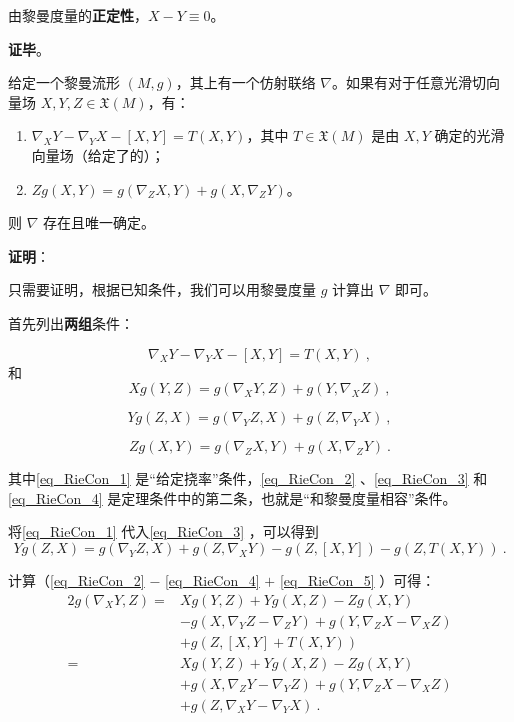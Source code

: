 由黎曼度量的\textbf{正定性}，$X-Y\equiv 0$。

\textbf{证毕}。






\begin{theorem}{}\label{the_RieCon_1}
给定一个黎曼流形 $(M, g)$，其上有一个仿射联络 $\nabla$。如果有对于任意光滑切向量场 $X, Y, Z\in\mathfrak{X}(M)$，有：
\begin{enumerate}
\item $\nabla_XY-\nabla_YX-[X, Y]=T(X, Y)$，其中 $T\in \mathfrak{X}(M)$ 是由 $X, Y$ 确定的光滑向量场（给定了的）；
\item $Zg(X, Y)=g(\nabla_ZX, Y)+g(X, \nabla_ZY)$。
\end{enumerate}
则 $\nabla$ 存在且唯一确定。
\end{theorem}

\textbf{证明}：

只需要证明，根据已知条件，我们可以用黎曼度量 $g$ 计算出 $\nabla$ 即可。

首先列出\textbf{两组}条件：

\begin{equation}\label{eq_RieCon_1}
\nabla_XY-\nabla_YX-[X, Y]=T(X, Y)~,
\end{equation}
和
\begin{equation}\label{eq_RieCon_2}
Xg(Y, Z)=g(\nabla_XY, Z)+g(Y, \nabla_XZ)~,
\end{equation}

\begin{equation}\label{eq_RieCon_3}
Yg(Z, X)=g(\nabla_YZ, X)+g(Z, \nabla_YX)~,
\end{equation}

\begin{equation}\label{eq_RieCon_4}
Zg(X, Y)=g(\nabla_ZX, Y)+g(X, \nabla_ZY)~.
\end{equation}


其中\autoref{eq_RieCon_1} 是“给定挠率”条件，\autoref{eq_RieCon_2} 、\autoref{eq_RieCon_3} 和\autoref{eq_RieCon_4} 是定理条件中的第二条，也就是“和黎曼度量相容”条件。

将\autoref{eq_RieCon_1} 代入\autoref{eq_RieCon_3} ，可以得到
\begin{equation}\label{eq_RieCon_5}
Yg(Z, X)=g(\nabla_YZ, X)+g(Z, \nabla_XY)-g(Z, [X, Y])-g(Z, T(X, Y))~.
\end{equation}

计算（\autoref{eq_RieCon_2} $-$ \autoref{eq_RieCon_4} $+$ \autoref{eq_RieCon_5} ）可得：
\begin{equation}\label{eq_RieCon_6}
\begin{aligned}
2g(\nabla_XY, Z)=&Xg(Y, Z)+Yg(X, Z)-Zg(X, Y)\\&-g(X, \nabla_YZ-\nabla_ZY)+g(Y, \nabla_ZX-\nabla_XZ)\\&+g(Z, [X, Y]+T(X, Y))\\
=&Xg(Y, Z)+Yg(X, Z)-Zg(X, Y)\\&+g(X, \nabla_ZY-\nabla_YZ)+g(Y, \nabla_ZX-\nabla_XZ)\\&+g(Z, \nabla_XY-\nabla_YX)~.
\end{aligned}
\end{equation}

